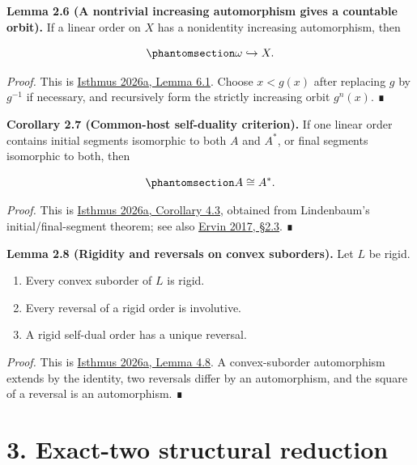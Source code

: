 \documentclass[
  english,
  11pt,
  reqno]{amsart}
\providecommand{\tightlist}{%
  \setlength{\itemsep}{0pt}\setlength{\parskip}{0pt}}
\begin{document}
\protect{}\label{lem:2-6-automorphism-orbit}

\textbf{Lemma 2.6 (A nontrivial increasing automorphism gives a
countable orbit).} If a linear order on \(X\) has a nonidentity
increasing automorphism, then

\begin{equation}\protect\phantomsection\label{eq:automorphism-orbit}{
\omega\hookrightarrow X.
}\end{equation}

\emph{Proof.} This is \hyperref[ref:isthmus2026a]{Isthmus 2026a, Lemma
6.1}. Choose \(x<g(x)\) after replacing \(g\) by \(g^{-1}\) if
necessary, and recursively form the strictly increasing orbit
\(g^n(x)\). ∎

\protect{}\label{cor:2-7-common-host}

\textbf{Corollary 2.7 (Common-host self-duality criterion).} If one
linear order contains initial segments isomorphic to both \(A\) and
\(A^*\), or final segments isomorphic to both, then

\begin{equation}\protect\phantomsection\label{eq:common-host}{
A\cong A^*.
}\end{equation}

\emph{Proof.} This is \hyperref[ref:isthmus2026a]{Isthmus 2026a,
Corollary 4.3}, obtained from Lindenbaum's initial/final-segment
theorem; see also \hyperref[ref:ervin2017]{Ervin 2017, §2.3}. ∎

\protect{}\label{lem:2-8-rigidity-convex}

\textbf{Lemma 2.8 (Rigidity and reversals on convex suborders).} Let
\(L\) be rigid.

\begin{enumerate}
\tightlist
\item
  Every convex suborder of \(L\) is rigid.
\item
  Every reversal of a rigid order is involutive.
\item
  A rigid self-dual order has a unique reversal.
\end{enumerate}

\emph{Proof.} This is \hyperref[ref:isthmus2026a]{Isthmus 2026a, Lemma
4.8}. A convex-suborder automorphism extends by the identity, two
reversals differ by an automorphism, and the square of a reversal is an
automorphism. ∎

\protect{}\label{sec:structural-reduction}

\section{3. Exact-two structural
reduction}\label{exact-two-structural-reduction}
\end{document}
